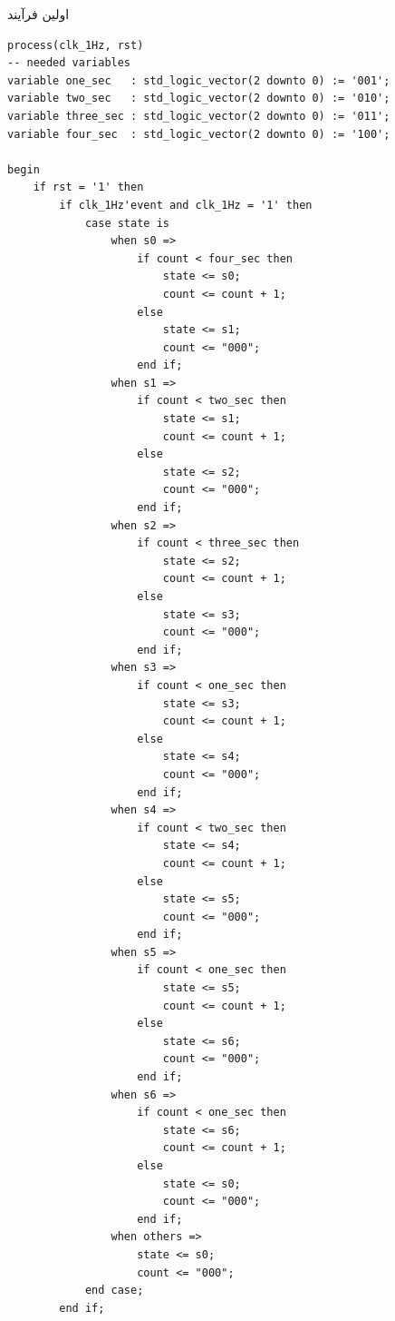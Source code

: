 \documentclass[dvipsnames, svgnames, x11names, a4paper, 11pt]{article}
\begin{document}
\newpage
اولین فرآیند
\begin{latin}
\begin{lstlisting}[firstnumber=29]
process(clk_1Hz, rst)
-- needed variables
variable one_sec   : std_logic_vector(2 downto 0) := '001';
variable two_sec   : std_logic_vector(2 downto 0) := '010';
variable three_sec : std_logic_vector(2 downto 0) := '011';
variable four_sec  : std_logic_vector(2 downto 0) := '100';

begin
	if rst = '1' then
        if clk_1Hz'event and clk_1Hz = '1' then
            case state is
                when s0 =>
                    if count < four_sec then
                        state <= s0;
                        count <= count + 1;
                    else
                        state <= s1;
                        count <= "000";
                    end if;
                when s1 =>
                    if count < two_sec then
                        state <= s1;
                        count <= count + 1;
                    else
                        state <= s2;
                        count <= "000";
                    end if;
                when s2 =>
                    if count < three_sec then
                        state <= s2;
                        count <= count + 1;
                    else
                        state <= s3;
                        count <= "000";
                    end if;
                when s3 =>
                    if count < one_sec then
                        state <= s3;
                        count <= count + 1;
                    else
                        state <= s4;
                        count <= "000";
                    end if;
                when s4 =>
                    if count < two_sec then
                        state <= s4;
                        count <= count + 1;
                    else
                        state <= s5;
                        count <= "000";
                    end if;
                when s5 =>
                    if count < one_sec then
                        state <= s5;
                        count <= count + 1;
                    else
                        state <= s6;
                        count <= "000";
                    end if;
                when s6 =>
                    if count < one_sec then
                        state <= s6;
                        count <= count + 1;
                    else
                        state <= s0;
                        count <= "000";
                    end if;
                when others =>
                    state <= s0;
                    count <= "000";
            end case;
        end if;
\end{lstlisting}
\end{latin}
\end{document}
